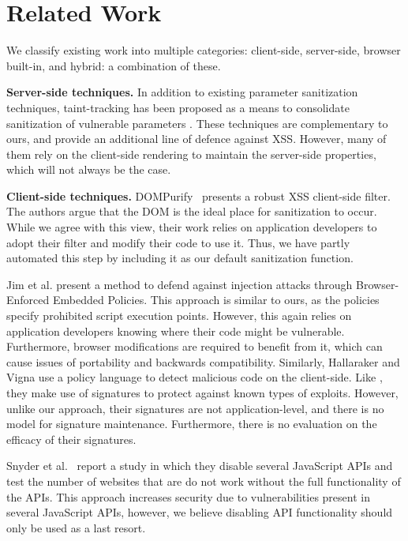 \section{Related Work}
We classify existing work into multiple categories: client-side, server-side, browser built-in, and hybrid: a combination of these.

\noindent \textbf{Server-side techniques.} 
In addition to existing parameter sanitization techniques,
taint-tracking has been proposed as a means to consolidate
sanitization of vulnerable parameters
\cite{Xu:2006:TPE:1267336.1267345,DBLP:conf/sec/Nguyen-TuongGGSE05,Pietraszek:2005:DAI:2146257.2146267,Bisht:2008:XPD:1428322.1428325}. These
techniques are complementary to ours, and provide an additional line
of defence against \ac{XSS}. However, many of them rely on the
client-side rendering to maintain the server-side properties, which
will not always be the case.

\noindent \textbf{Client-side techniques.} 
DOMPurify~\cite{10.1007/978-3-319-66399-9_7} presents a robust
\ac{XSS} client-side filter. The authors
argue that the DOM is the ideal place for sanitization to occur. While
we agree with this view, their work relies on application developers
to adopt their filter and modify their code to use it. Thus, we have partly automated this step by including it as our default sanitization function.

Jim et al. \cite{Jim:2007:DSI:1242572.1242654} present a method to
defend against injection attacks through Browser-Enforced Embedded
Policies. This approach is similar to ours, as the policies specify
prohibited script execution points. However, this again relies on application developers knowing where their code might be vulnerable. Furthermore, browser modifications are required to benefit from it, which can cause issues of portability and backwards compatibility. Similarly, Hallaraker and Vigna \cite{Hallaraker:2005:DMJ:1078029.1078861} use a
policy language to detect malicious code on the client-side. Like \sys, they make use of signatures to protect against known types of
exploits. However, unlike our approach, their signatures are not
application-level, and there is no model for signature
maintenance. Furthermore, there is no evaluation on the efficacy of
their signatures.

Snyder et al.~\cite{Snyder:2017:MWD:3133956.3133966} report a study in which
they disable several JavaScript APIs and test the number of websites
that are do not work without the full functionality of the APIs. This approach increases security due to vulnerabilities present in several
JavaScript APIs, however, we believe disabling API functionality
should only be used as a last resort.

